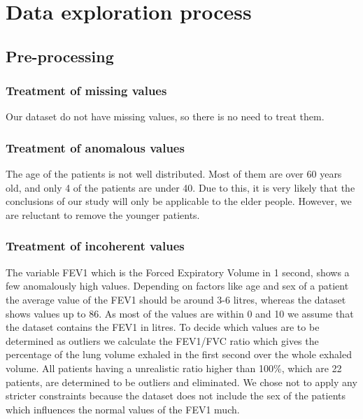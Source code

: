 

\section{Data exploration process}

\subsection{Pre-processing}
\subsubsection{Treatment of missing values}
Our dataset do not have missing values, so there is no need to treat them.
\subsubsection{Treatment of anomalous values}

The age of the patients is not well distributed. Most of them are over 60 years old, and only 4 of the patients are under 40. Due to this, it is very likely that the conclusions of our study will only be applicable to the elder people. However, we are reluctant to remove the younger patients.

\subsubsection{Treatment of incoherent values} \label{sec-inco-val}
The variable FEV1 which is the Forced Expiratory Volume in 1 second, shows a few anomalously high values. Depending on factors like age and sex of a patient the average value of the FEV1 should be around 3-6 litres, whereas the dataset shows values up to 86. As most of the values are within 0 and 10 we assume that the dataset contains the FEV1 in litres. To decide which values are to be determined as outliers we calculate the FEV1/FVC ratio which gives the percentage of the lung volume exhaled in the first second over the whole exhaled volume. All patients having a unrealistic ratio higher than 100\%, which are 22 patients, are determined to be outliers and eliminated. We chose not to apply any stricter constraints because the dataset does not include the sex of the patients which influences the normal values of the FEV1 much.

